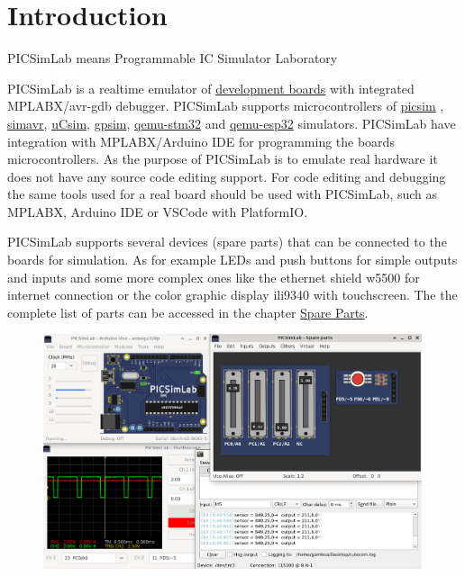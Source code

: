 \chapter{Introduction}


PICSimLab means Programmable IC Simulator Laboratory

PICSimLab is a realtime emulator of \hyperlink{def:boards}{development boards} with integrated 
MPLABX/avr-gdb debugger. 
PICSimLab supports microcontrollers of \href{https://github.com/lcgamboa/picsim}{picsim} , 
\href{https://github.com/buserror/simavr}{simavr}, \href{http://mazsola.iit.uni-miskolc.hu/\%7edrdani/embedded/ucsim/}{uCsim}, 
\href{http://gpsim.sourceforge.net/}{gpsim}, \href{http://beckus.github.io/qemu_stm32/}{qemu-stm32} and 
\href{https://github.com/a159x36/qemu}{qemu-esp32} simulators.
PICSimLab have integration with MPLABX/Arduino IDE for programming the boards microcontrollers.
As the purpose of PICSimLab is to emulate real hardware it does not have any source code editing support.
For code editing and debugging the same tools used for a real board should be used with PICSimLab, such as
MPLABX, Arduino IDE or VSCode with PlatformIO. 

PICSimLab supports several devices (spare parts) that can be connected to the boards for simulation. 
As for example LEDs and push buttons for simple outputs and inputs and some more complex ones like the ethernet 
shield w5500 for internet connection or the color graphic display ili9340 with touchscreen. 
The the complete list of parts can be accessed in the chapter \hyperlink{def:spare}{Spare Parts}. 



\begin{figure}[H]
\center
\includegraphics[width=0.99\textwidth]{img/screenshot.png} 
\end{figure} 

